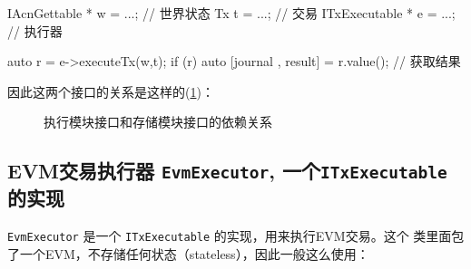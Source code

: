 \begin{simplec}
IAcnGettable * w = ...;         // 世界状态
Tx t = ...;                     // 交易
ITxExecutable * e = ...;        // 执行器

auto r = e->executeTx(w,t);
if (r){
  auto [journal , result] = r.value(); // 获取结果
}
\end{simplec}

因此这两个接口的关系是这样的(\cref{fig:exe-storage-relationship})：
\begin{figure}[h]
  \centering
  \caption{执行模块接口和存储模块接口的依赖关系}
  \label{fig:exe-storage-relationship}
\end{figure}
\FloatBarrier                   %
\subsection{EVM交易执行器 \texttt{EvmExecutor}, 一个\texttt{ITxExecutable}的实现}
\label{sec:EvmExecutor}
\texttt{EvmExecutor} 是一个 \texttt{ITxExecutable} 的实现，用来执行EVM交易。这个
类里面包了一个EVM，不存储任何状态（stateless），因此一般这么使用：

